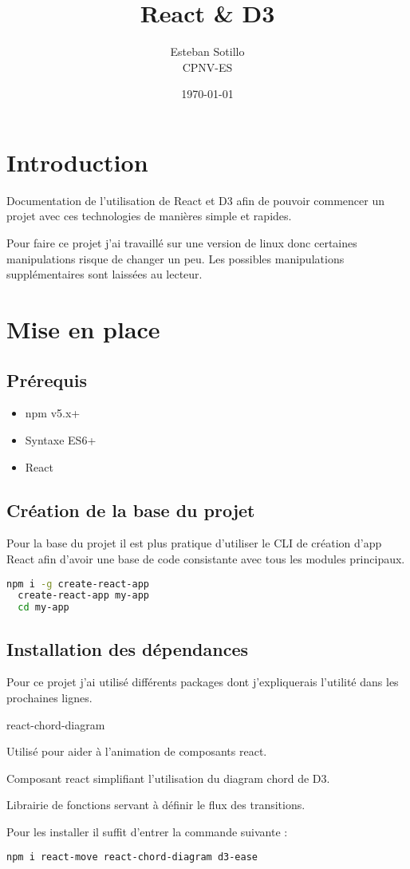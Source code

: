 \documentclass[a4paper, french, 12pt]{extarticle}
\title{React \& D3}
\author{Esteban Sotillo\\{\small CPNV-ES}}
\date{{\small \today}}
\begin{document}
\maketitle
\section{Introduction}
Documentation de l'utilisation de React et D3 afin de pouvoir commencer un projet avec ces technologies de manières simple et rapides.

Pour faire ce projet j'ai travaillé sur une version de linux donc certaines manipulations risque de changer un peu. Les possibles manipulations supplémentaires sont laissées au lecteur.

\pagebreak
\section{Mise en place}
\subsection{Prérequis}
\begin{itemize}
  \item npm v5.x+
  \item Syntaxe ES6+
  \item React
\end{itemize}

\subsection{Création de la base du projet}
Pour la base du projet il est plus pratique d'utiliser le CLI de création d'app React afin d'avoir une base de code consistante avec tous les modules principaux.
\begin{lstlisting}[language=bash]
  npm i -g create-react-app
  create-react-app my-app
  cd my-app
\end{lstlisting}

\subsection{Installation des dépendances}
Pour ce projet j'ai utilisé différents packages dont j'expliquerais l'utilité dans les prochaines lignes.

\begin{labeling}{react-chord-diagram}
  \item [react-move] Utilisé pour aider à l'animation de composants react.
  \item [react-chord-diagram] Composant react simplifiant l'utilisation du diagram chord de D3.
  \item [d3-ease] Librairie de fonctions servant à définir le flux des transitions.
\end{labeling}
Pour les installer il suffit d'entrer la commande suivante : 
\begin{lstlisting}[language=bash]
  npm i react-move react-chord-diagram d3-ease
\end{lstlisting}
\end{document}
